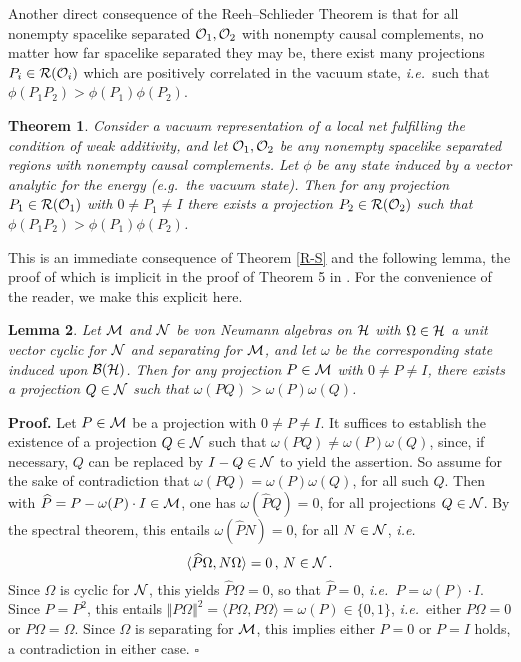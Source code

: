 \documentclass[12pt]{article}
\newtheorem{theorem}{Theorem}[section]
\newtheorem{lemma}[theorem]{Lemma}
\newenvironment{proof}{\medskip \noindent 
            {\bf Proof.}}{ \hfill $\square$ \medskip}
\newcommand{\ie}{{\it i.e.\ }}
\newcommand{\eg}{{\it e.g.\ }}
\def\Bs{{\cal B}}
\def\Hs{{\cal H}}
\def\Ms{{\cal M}}
\def\Ns{{\cal N}}
\def\Os{{\cal O}}
\def\Rs{{\cal R}}
\begin{document}
Another direct consequence of the Reeh--Schlieder Theorem is that
for all nonempty spacelike separated $\Os_1,\Os_2$ with nonempty 
causal complements, no matter how far spacelike separated they may be, 
there exist many projections $P_i \in \Rs(\Os_i)$ which are positively 
correlated in the vacuum state, \ie such that 
$\phi(P_1 P_2) > \phi(P_1) \phi(P_2)$.

\begin{theorem}  \label{mine}
Consider a vacuum representation of a local net fulfilling the condition
of weak additivity, and let $\Os_1,\Os_2$ be any nonempty spacelike separated 
regions with nonempty causal complements. Let $\phi$ be any state induced
by a vector analytic for the energy (\eg the vacuum state). Then for 
any projection $P_1 \in \Rs(\Os_1)$ with $0 \neq P_1 \neq I$ 
there exists a projection 
$P_2 \in \Rs(\Os_2)$ such that $\phi(P_1 P_2) > \phi(P_1) \phi(P_2)$. 
\end{theorem}

     This is an immediate consequence of Theorem \ref{R-S} and the
following lemma, the proof of which is implicit in the proof of
Theorem 5 in \cite{Red}. For the convenience of the reader, we make
this explicit here.

\begin{lemma}
Let $\Ms$ and $\Ns$ be von Neumann algebras on $\Hs$ with $\Omega \in \Hs$
a unit vector cyclic for $\Ns$ and separating for $\Ms$, and let $\omega$ 
be the corresponding state induced upon $\Bs(\Hs)$. Then for any projection
$P \in \Ms$ with $0 \neq P \neq I$, there exists a projection $Q \in \Ns$
such that $\omega(PQ) > \omega(P)\omega(Q)$.
\end{lemma}

\begin{proof}
Let $P \in \Ms$ be a projection with $0 \neq P \neq I$. It suffices 
to establish the existence of a projection $Q \in \Ns$ such that 
$\omega(PQ) \neq \omega(P)\omega(Q)$, since, if necessary, $Q$ can
be replaced by $I - Q \in \Ns$ to yield the assertion. So assume
for the sake of contradiction that
$\omega(PQ) = \omega(P)\omega(Q)$, for all such $Q$. Then with
$\widehat{P} = P - \omega(P) \cdot I \in \Ms$, one has
$\omega(\widehat{P}Q) = 0$, for all projections $Q \in \Ns$. By the 
spectral theorem, this entails $\omega(\widehat{P}N) = 0$, 
for all $N \in \Ns$, \ie
%
$$\langle \widehat{P} \Omega, N \Omega \rangle = 0 \, , \, N \in \Ns \, .$$
%
Since $\Omega$ is cyclic for $\Ns$, this yields $\widehat{P} \Omega = 0$, 
so that $\widehat{P} = 0$, \ie $P = \omega(P) \cdot I$. Since $P = P^2$,
this entails $\Vert P\Omega \Vert^2 = \langle P\Omega, P\Omega\rangle = 
\omega(P) \in \{ 0,1 \}$, 
\ie either $P\Omega = 0$ or $P\Omega = \Omega$. Since $\Omega$ is
separating for $\Ms$, this implies either $P = 0$ or $P = I$ holds, 
a contradiction in either case.
\end{proof}
\end{document}
